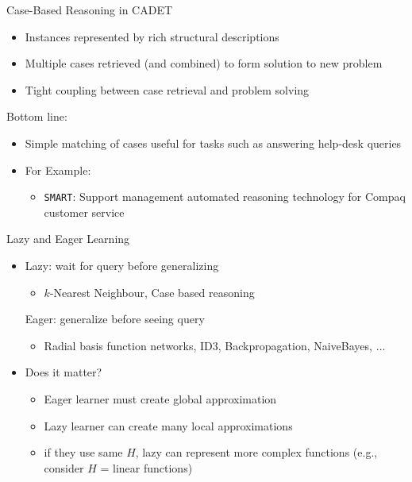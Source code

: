 \documentclass[%
pdf,
colorBG,
slideColor,
tcrico,
]{prosper}
\begin{document}

\begin{slide}{Case-Based Reasoning in CADET }
\tiny
\begin{itemize}
\item Instances represented by rich structural descriptions
\item Multiple cases retrieved (and combined) to form solution to new problem
\item Tight coupling between case retrieval and problem solving
\end{itemize}

Bottom line: 

\begin{itemize} 
\item Simple matching of cases useful for tasks such as answering help-desk queries 
\item For Example:
	\begin{itemize}
	\item \texttt{SMART}: Support management automated reasoning technology for Compaq customer service
	\end{itemize}
\end{itemize}
\end{slide}


\begin{slide}{Lazy and Eager Learning }
\begin{itemize}
 \item  Lazy: wait for query before generalizing
	\begin{itemize} \item {$k$-Nearest Neighbour}, Case based reasoning \end{itemize}
	\bigskip
	Eager: generalize before seeing query
	\begin{itemize} \item Radial basis function networks,  ID3, Backpropagation, NaiveBayes, $\ldots$ \end{itemize}
\item  Does it matter?
	\begin{itemize}
	\item Eager learner must create global approximation
	\item Lazy learner can create many local approximations
	\item if they use same $H$, lazy can represent more complex functions (e.g.,
	consider $H$ = linear functions)
	\end{itemize}
\end{itemize}
\end{slide}
\end{document}

